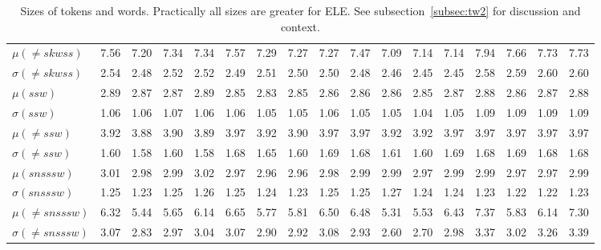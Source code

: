 \documentclass[%
 aip,
 jmp,%
 amsmath,amssymb,
 reprint,%
]{revtex4-1}
\begin{document}
\begin{table}
\begin{tabular}{|l|| c|c|c|c||  c|c|c|c||   c|c|c|c||   c|c|c|c|}
$\mu(\neq skwss)$ & 7.56 & 7.20 & 7.34 & 7.34 & 7.57 & 7.29 & 7.27 & 7.27 & 7.47 & 7.09 & 7.14 & 7.14 & 7.94 & 7.66 & 7.73 & 7.73 \\
$\sigma(\neq skwss)$ & 2.54 & 2.48 & 2.52 & 2.52 & 2.49 & 2.51 & 2.50 & 2.50 & 2.48 & 2.46 & 2.45 & 2.45 & 2.58 & 2.59 & 2.60 & 2.60 \\ \hline
$\mu(ssw)$ & 2.89 & 2.87 & 2.87 & 2.89 & 2.85 & 2.83 & 2.85 & 2.86 & 2.86 & 2.86 & 2.85 & 2.87 & 2.88 & 2.86 & 2.87 & 2.88 \\
$\sigma(ssw)$ & 1.06 & 1.06 & 1.07 & 1.06 & 1.06 & 1.05 & 1.05 & 1.06 & 1.05 & 1.05 & 1.04 & 1.05 & 1.09 & 1.09 & 1.09 & 1.09 \\
$\mu(\neq ssw)$ & 3.92 & 3.88 & 3.90 & 3.89 & 3.97 & 3.92 & 3.90 & 3.97 & 3.97 & 3.92 & 3.92 & 3.97 & 3.97 & 3.97 & 3.97 & 3.97 \\
$\sigma(\neq ssw)$ & 1.60 & 1.58 & 1.60 & 1.58 & 1.68 & 1.65 & 1.60 & 1.69 & 1.68 & 1.61 & 1.60 & 1.69 & 1.68 & 1.69 & 1.68 & 1.68 \\ \hline
$\mu(snsssw)$ & 3.01 & 2.98 & 2.99 & 3.02 & 2.97 & 2.96 & 2.96 & 2.98 & 2.99 & 2.99 & 2.97 & 2.99 & 2.99 & 2.97 & 2.97 & 2.99 \\
$\sigma(snsssw)$ & 1.25 & 1.23 & 1.25 & 1.26 & 1.25 & 1.24 & 1.23 & 1.25 & 1.25 & 1.27 & 1.24 & 1.24 & 1.23 & 1.22 & 1.22 & 1.23 \\
$\mu(\neq snsssw)$ & 6.32 & 5.44 & 5.65 & 6.14 & 6.65 & 5.77 & 5.81 & 6.50 & 6.48 & 5.31 & 5.53 & 6.43 & 7.37 & 5.83 & 6.14 & 7.30 \\
$\sigma(\neq snsssw)$ & 3.07 & 2.83 & 2.97 & 3.04 & 3.07 & 2.90 & 2.92 & 3.08 & 2.93 & 2.60 & 2.70 & 2.98 & 3.37 & 3.02 & 3.26 & 3.39 \\ \hline
  \end{tabular}
  \caption{Sizes of tokens and words. Practically all sizes are greater for ELE. See subsection~\ref{subsec:tw2} for discussion and context.}
  \label{tab:sizesTokens}
\end{table}
\end{document}

